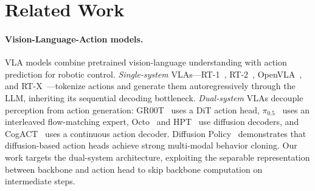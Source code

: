 \documentclass{article}
\begin{document}
\section{Related Work}

\paragraph{Vision-Language-Action models.}
VLA models combine pretrained vision-language understanding with action prediction for robotic control.
\emph{Single-system} VLAs---RT-1~\cite{brohan2023rt1}, RT-2~\cite{brohan2023rt2}, OpenVLA~\cite{kim2024openvla}, and RT-X~\cite{padalkar2024rtx}---tokenize actions and generate them autoregressively through the LLM, inheriting its sequential decoding bottleneck.
\emph{Dual-system} VLAs decouple perception from action generation: GR00T~\cite{bjorck2025groot} uses a DiT action head, $\pi_{0.5}$~\cite{black2024pi0} uses an interleaved flow-matching expert, Octo~\cite{team2024octo} and HPT~\cite{wang2024hpt} use diffusion decoders, and CogACT~\cite{li2024cogact} uses a continuous action decoder.
Diffusion Policy~\cite{chi2023diffusion} demonstrates that diffusion-based action heads achieve strong multi-modal behavior cloning.
Our work targets the dual-system architecture, exploiting the separable representation between backbone and action head to skip backbone computation on intermediate steps.
\end{document}
